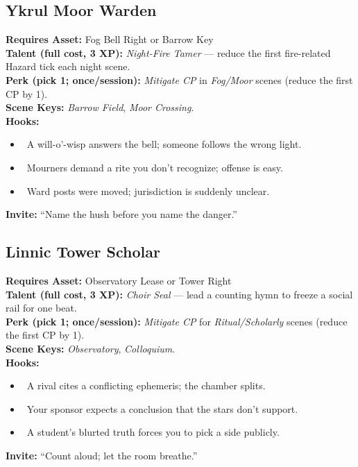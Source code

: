 \documentclass[11pt]{article}
\begin{document}
\subsection*{Ykrul Moor Warden}
\textbf{Requires Asset:} Fog Bell Right or Barrow Key\\
\textbf{Talent (full cost, 3 XP):} \emph{Night-Fire Tamer} — reduce the first fire-related Hazard tick each night scene.\\
\textbf{Perk (pick 1; once/session):} \emph{Mitigate CP} in \emph{Fog/Moor} scenes (reduce the first CP by 1).\\
\textbf{Scene Keys:} \emph{Barrow Field}, \emph{Moor Crossing}.\\[2pt]
\textbf{Hooks:}
\begin{itemize}
  \item \spadesuit~A will-o’-wisp answers the bell; someone follows the wrong light.
  \item \heartsuit~Mourners demand a rite you don’t recognize; offense is easy.
  \item \clubsuit~Ward posts were moved; jurisdiction is suddenly unclear.
\end{itemize}
\textbf{Invite:} “Name the hush before you name the danger.”

\subsection*{Linnic Tower Scholar}
\textbf{Requires Asset:} Observatory Lease or Tower Right\\
\textbf{Talent (full cost, 3 XP):} \emph{Choir Seal} — lead a counting hymn to freeze a social rail for one beat.\\
\textbf{Perk (pick 1; once/session):} \emph{Mitigate CP} for \emph{Ritual/Scholarly} scenes (reduce the first CP by 1).\\
\textbf{Scene Keys:} \emph{Observatory}, \emph{Colloquium}.\\[2pt]
\textbf{Hooks:}
\begin{itemize}
  \item \clubsuit~A rival cites a conflicting ephemeris; the chamber splits.
  \item \diamondsuit~Your sponsor expects a conclusion that the stars don’t support.
  \item \heartsuit~A student’s blurted truth forces you to pick a side publicly.
\end{itemize}
\textbf{Invite:} “Count aloud; let the room breathe.”
\end{document}

